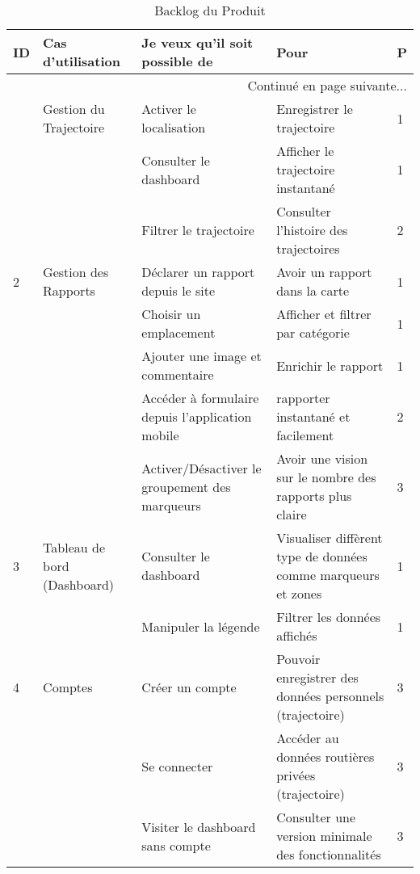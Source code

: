 \begin{center}
    \footnotesize
    \setlength\LTleft{-20pt}
    \begin{longtable}{| l | p{3.5cm} | p{5.5cm} | p{5cm} | l |}
        \caption{Backlog du Produit}
        \label{tab:product-backlog} \\

        \hline
        \textbf{ID} & \textbf{Cas d'utilisation} & \textbf{Je veux qu'il soit possible de} & \textbf{Pour} & \textbf{P} \\ \hline
        \endhead

        \hline \multicolumn{5}{|r|}{{Continué en page suivante$\dotsc$}} \\ \hline
        \endfoot

        \hline \hline
        \endlastfoot

        \hline
1 & Gestion du Trajectoire & Activer le localisation & Enregistrer le trajectoire & 1 \\ \cline{3-5}
&                          & Consulter le dashboard  & Afficher le trajectoire instantané & 1 \\ \cline{3-5}
&                          & Filtrer le trajectoire  & Consulter l'histoire des trajectoires & 2 \\ \hline
2 & Gestion des Rapports   & Déclarer un rapport depuis le site & Avoir un rapport dans la carte & 1 \\ \cline{3-5}
&                          & Choisir un emplacement & Afficher et filtrer par catégorie & 1 \\ \cline{3-5}
&                          & Ajouter une image et commentaire & Enrichir le rapport & 1 \\ \cline{3-5}
&                          & Accéder à formulaire depuis l'application mobile & rapporter instantané et facilement & 2 \\ \cline{3-5}
&                          & Activer/Désactiver le groupement des marqueurs & Avoir une vision sur le nombre des rapports plus claire & 3 \\ \hline
3 & Tableau de bord (Dashboard) & Consulter le dashboard & Visualiser diffèrent type de données comme marqueurs et zones & 1 \\ \cline{3-5}
&                               & Manipuler la légende   & Filtrer les données affichés & 1 \\ \hline
4 & Comptes                & Créer un compte & Pouvoir enregistrer des données personnels (trajectoire) & 3 \\ \cline{3-5}
&                          & Se connecter & Accéder au données routières privées (trajectoire) & 3 \\ \cline{3-5}
&                          & Visiter le dashboard sans compte & Consulter une version minimale des fonctionnalités & 3 \\
        \hline
    \end{longtable}
\end{center}

